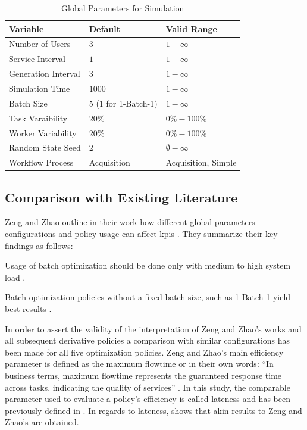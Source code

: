 \documentclass{seal_thesis}
\begin{document}
\begin{table}[!ht]
\centering
\begin{tabular}{@{}lll@{}}
\toprule
Variable            & Default     & Valid Range \\ \midrule
Number of Users     & $3$           & $1-\infty$      \\
Service Interval    & $1$           & $1-\infty$      \\
Generation Interval & $3$           & $1-\infty$      \\
Simulation Time     & $1000$          & $1-\infty$      \\
Batch Size          & $5$ ($1$ for 1-Batch-1)           & $1-\infty$      \\
Task Varaibility    & $20\%$        & $0\%-100\%$      \\
Worker Variability  & $20\%$        & $0\%-100\%$      \\
Random State Seed   & $2$           & $\emptyset-\infty$      \\
Workflow Process    & Acquisition & Acquisition, Simple      \\ \bottomrule
\end{tabular}
\caption{Global Parameters for Simulation}
\label{tab:global_parameters_sim}
\end{table}

\subsection{Comparison with Existing Literature}
\label{subsec:opt_comparison}

Zeng and Zhao outline in their work how different global parameters configurations and policy usage can affect \glspl{kpi} \cite[pp. 18-22]{Zeng2005}. They summarize their key findings as follows:
\begin{enumerate*}
	\item Usage of batch optimization should be done only with medium to high system load \cite[p. 24]{Zeng2005}.
	\item Batch optimization policies without a fixed batch size, such as 1-Batch-1 yield best results \cite[p. 24]{Zeng2005}.
\end{enumerate*}

In order to assert the validity of the interpretation of Zeng and Zhao's works and all subsequent derivative policies a comparison with similar configurations has been made for all five optimization policies. Zeng and Zhao's main efficiency parameter is defined as the maximum flowtime or in their own words: ``In business terms, maximum flowtime represents the guaranteed response time across tasks, indicating the quality of services'' \cite[p. 17]{Zeng2005}. In this study, the comparable parameter used to evaluate a policy's efficiency is called lateness and has been previously defined in . In regards to lateness,  shows that akin results to Zeng and Zhao's are obtained.
\end{document}
